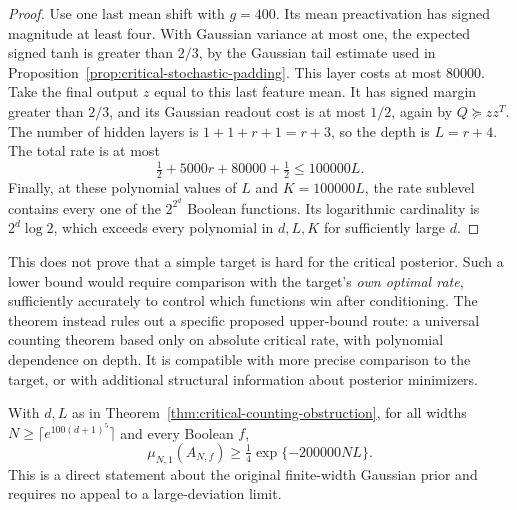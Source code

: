\begin{proof}
Use one last mean shift with $g=400$. Its mean preactivation has
signed magnitude at least four. With Gaussian variance at most one,
the expected signed tanh is greater than $2/3$, by the Gaussian tail
estimate used in Proposition~\ref{prop:critical-stochastic-padding}.
This layer costs at most $80000$.
Take the final output $z$ equal to this last feature mean. It has
signed margin greater than $2/3$, and its Gaussian readout cost is
at most $1/2$, again by $Q\succeq zz^T$.
The number of hidden layers is $1+1+r+1=r+3$, so the depth is
$L=r+4$. The total rate is at most
\[
 \tfrac12+5000r+80000+\tfrac12\le100000L.
\]
Finally, at these polynomial values of $L$ and $K=100000L$, the rate
sublevel contains every one of the $2^{2^d}$ Boolean functions. Its
logarithmic cardinality is $2^d\log2$, which exceeds every polynomial
in $d,L,K$ for sufficiently large $d$.
\end{proof}

This does not prove that a simple target is hard for the critical
posterior. Such a lower bound would require comparison with the target's
\emph{own optimal rate}, sufficiently accurately to control which
functions win after conditioning. The theorem instead rules out a
specific proposed upper-bound route: a universal counting theorem based
only on absolute critical rate, with polynomial dependence on depth.
It is compatible with more precise comparison to the target, or with
additional structural information about posterior minimizers.


\begin{proposition}
\label{prop:critical-finitewidth-capacity}
With $d,L$ as in Theorem~\ref{thm:critical-counting-obstruction}, for
all widths $N\ge\lceil e^{100(d+1)^5}\rceil$ and every Boolean $f$,
\[
 \mu_{N,1}(A_{N,f})\ge\tfrac14
                  \exp\{-200000NL\}.
\]
This is a direct statement about the original finite-width Gaussian
prior and requires no appeal to a large-deviation limit.
\end{proposition}

